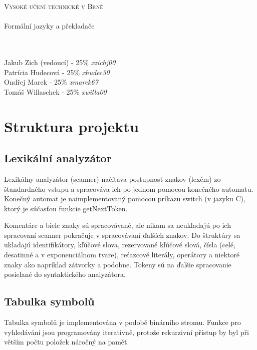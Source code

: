 \documentclass[11pt, a4paper]{article}
\begin{document}
	\begin{titlepage}
		\begin{center}
			 \textsc{{\Huge Vysoké učení technické v Brně}\\ 
			 \vspace{8.5pt}{\huge Fakulta informačních technologií}}\\
			{\LARGE Formální jazyky a překladače\\}
				\vspace{5pt}{\Huge Dokumentace ke skupinovému projektu}\\
				\vspace{2pt}{\Large Tým 47, varianta I}
			\\
		\end{center}
		{\small Jakub Zich (vedoucí) - 25\% \emph{xzichj00} \hfill \\
		Patrícia Hudecová - 25\% \emph{xhudec30} \hfill \\
		Ondřej Marek - 25\% \emph{xmarek67} \hfill\\
		Tomáš Willaschek - 25\% \emph{xwilla00} \hfill }
	
	\end{titlepage}	
	\section{Struktura projektu}
	
	\subsection{Lexikální analyzátor}
Lexikálny analyzátor (scanner) načítava postupnosť znakov (lexém) zo štandardného vstupu a spracováva ich po jednom  pomocou konečného automatu. Konečný automat je naimplementovaný pomocou príkazu switch  (v jazyku C), ktorý je súčasťou funkcie getNextToken.

Komentáre a biele znaky sú spracovávané, ale nikam sa neukladajú po ich spracovaní scanner pokračuje v spracovávaní ďalších znakov. Do štruktúry sa ukladajú identifikátory, kľúčové slova, rezervované kľúčové slová,  čísla (celé, desatinné a v exponenciálnom tvare), reťazcové literály, operátory a niektoré znaky ako napríklad zátvorky a podobne. Tokeny sú na ďalšie spracovanie posielané do syntaktického analyzátora. 

	\subsection{Tabulka symbolů}
    Tabulka symbolů je implementována v podobě binárního stromu. Funkce pro vyhledáváni jsou programovány iterativně, protože rekurzivní přístup by byl při větším počtu položek náročný na paměť.
		
\end{document}
